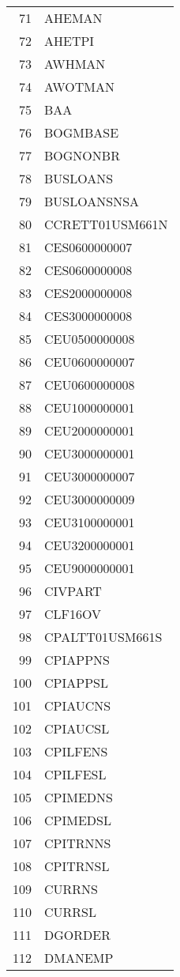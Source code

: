 \begin{table}[ht]
\begin{tabular}{rl}
  71 & AHEMAN \\ 
  72 & AHETPI \\ 
  73 & AWHMAN \\ 
  74 & AWOTMAN \\ 
  75 & BAA \\ 
  76 & BOGMBASE \\ 
  77 & BOGNONBR \\ 
  78 & BUSLOANS \\ 
  79 & BUSLOANSNSA \\ 
  80 & CCRETT01USM661N \\ 
  81 & CES0600000007 \\ 
  82 & CES0600000008 \\ 
  83 & CES2000000008 \\ 
  84 & CES3000000008 \\ 
  85 & CEU0500000008 \\ 
  86 & CEU0600000007 \\ 
  87 & CEU0600000008 \\ 
  88 & CEU1000000001 \\ 
  89 & CEU2000000001 \\ 
  90 & CEU3000000001 \\ 
  91 & CEU3000000007 \\ 
  92 & CEU3000000009 \\ 
  93 & CEU3100000001 \\ 
  94 & CEU3200000001 \\ 
  95 & CEU9000000001 \\ 
  96 & CIVPART \\ 
  97 & CLF16OV \\ 
  98 & CPALTT01USM661S \\ 
  99 & CPIAPPNS \\ 
  100 & CPIAPPSL \\ 
  101 & CPIAUCNS \\ 
  102 & CPIAUCSL \\ 
  103 & CPILFENS \\ 
  104 & CPILFESL \\ 
  105 & CPIMEDNS \\ 
  106 & CPIMEDSL \\ 
  107 & CPITRNNS \\ 
  108 & CPITRNSL \\ 
  109 & CURRNS \\ 
  110 & CURRSL \\ 
  111 & DGORDER \\ 
  112 & DMANEMP \\ 

\end{tabular}
\end{table}
